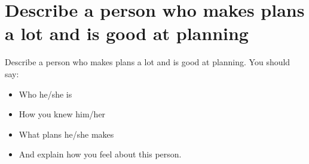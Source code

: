 \newpage

\section{Describe a person who makes plans a lot and is good at planning}
\begin{ieltsprompt}
Describe a person who makes plans a lot and is good at planning.
You should say:
\begin{itemize}[leftmargin=2em, itemsep=2pt]
\item Who he/she is
\item How you knew him/her
\item What plans he/she makes
\item And explain how you feel about this person.
\end{itemize}
\end{ieltsprompt}
